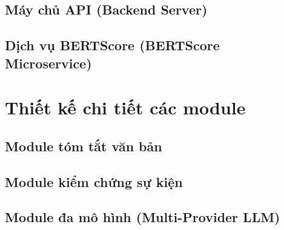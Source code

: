 \subsection{Máy chủ API (Backend Server)}

\subsection{Dịch vụ BERTScore (BERTScore Microservice)}

\section{Thiết kế chi tiết các module}

\subsection{Module tóm tắt văn bản}

\subsection{Module kiểm chứng sự kiện}

\subsection{Module đa mô hình (Multi-Provider LLM)}

